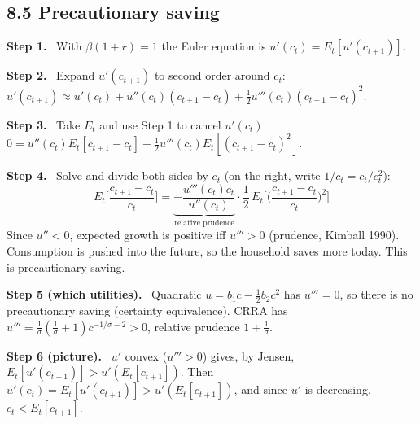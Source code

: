 \documentclass[12pt]{article}
\newcommand{\st}[1]{\par\smallskip\textbf{Step #1.}\ }
\newcommand{\ans}[1]{\[\boxed{\ #1\ }\]}
\begin{document}
\subsection*{8.5 Precautionary saving}
\st{1} With $\beta(1+r)=1$ the Euler equation is $u'(c_t)=E_t[u'(c_{t+1})]$.
\st{2} Expand $u'(c_{t+1})$ to second order around $c_t$:
$u'(c_{t+1})\approx u'(c_t)+u''(c_t)(c_{t+1}-c_t)+\frac12u'''(c_t)(c_{t+1}-c_t)^2$.
\st{3} Take $E_t$ and use Step 1 to cancel $u'(c_t)$:
$0=u''(c_t)E_t[c_{t+1}-c_t]+\frac12u'''(c_t)E_t[(c_{t+1}-c_t)^2]$.
\st{4} Solve and divide both sides by $c_t$ (on the right, write $1/c_t=c_t/c_t^2$):
\ans{E_t\Big[\frac{c_{t+1}-c_t}{c_t}\Big]=\underbrace{-\frac{u'''(c_t)c_t}{u''(c_t)}}_{\text{relative prudence}}\cdot\frac12\,E_t\Big[\Big(\frac{c_{t+1}-c_t}{c_t}\Big)^2\Big]}
Since $u''<0$, expected growth is positive iff $u'''>0$ (prudence, Kimball 1990).
Consumption is pushed into the future, so the household saves more today. This is precautionary saving.
\st{5 (which utilities)} Quadratic $u=b_1c-\frac12b_2c^2$ has $u'''=0$, so there is no precautionary saving (certainty equivalence). CRRA has $u'''=\frac1\sigma(\frac1\sigma+1)c^{-1/\sigma-2}>0$, relative prudence $1+\frac1\sigma$.
\st{6 (picture)} $u'$ convex ($u'''>0$) gives, by Jensen, $E_t[u'(c_{t+1})]>u'(E_t[c_{t+1}])$. Then $u'(c_t)=E_t[u'(c_{t+1})]>u'(E_t[c_{t+1}])$, and since $u'$ is decreasing, $c_t<E_t[c_{t+1}]$.
\end{document}
